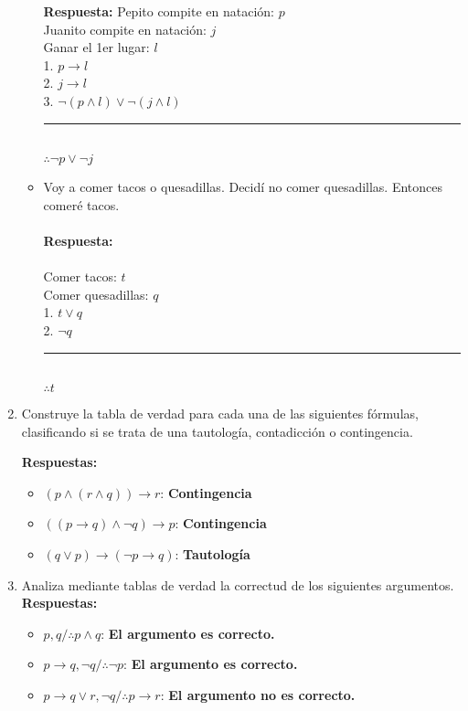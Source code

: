 \documentclass{article}
\begin{document}
\begin{enumerate}
\begin{itemize}
			\textbf{\large Respuesta:}\normalsize 
			Pepito compite en natación: $p$ \\
			Juanito compite en natación: $j$ \\
			Ganar el 1er lugar: $l$	\\

			1. $p \rightarrow l$\\
			2. $j \rightarrow l$\\
			3. $\neg (p \wedge l) \vee \neg (j \wedge l)$\\
			\noindent\rule{3cm}{0.4pt} \\
			$\therefore \neg p \vee \neg j$ \\
			\item Voy a comer tacos o quesadillas. Decidí no comer quesadillas. Entonces comeré tacos. \\
			\\ \textbf{\large Respuesta:\\}\normalsize \\
			Comer tacos: $t$ \\
			Comer quesadillas: $q$ \\ 			
			1. $t \vee q$ \\
			2. $\neg q$ \\
			\noindent\rule{3cm}{0.4pt} \\
			$\therefore t$
			
		\end{itemize}
	\item{Construye la tabla de verdad para cada una de las siguientes fórmulas, clasificando si se trata de una tautología, contadicción o contingencia.}
		
		\textbf{\large Respuestas:}\normalsize
		\begin{itemize}
			\item{$(p \wedge (r \wedge q)) \rightarrow r$}: \textbf{Contingencia}
			\item{$((p \rightarrow q) \wedge \neg q) \rightarrow p$}: \textbf{Contingencia}
			\item{$(q \vee p) \rightarrow (\neg p \rightarrow q)$}: \textbf{Tautología}
		\end{itemize}
	\item{Analiza mediante tablas de verdad la correctud de los siguientes argumentos.}
		\\ \textbf{\large Respuestas:}\normalsize 
		\begin{itemize}
			\item{$p,q / \therefore p \wedge q $}: \textbf{El argumento es correcto.}
			\item{$p \rightarrow q, \neg q / \therefore \neg p$}: \textbf{El argumento es correcto.}
			\item{$p \rightarrow q \vee r, \neg q / \therefore p \rightarrow r$}: \textbf{El argumento no es correcto.}
		\end{itemize}	

\end{enumerate}
\end{document}
